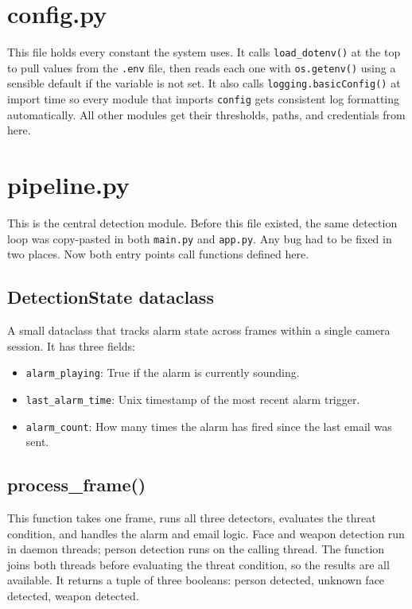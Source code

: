 \documentclass[12pt,a4paper]{report}
\begin{document}
\section{config.py}

This file holds every constant the system uses. It calls \texttt{load\_dotenv()} at the top to pull values from the \texttt{.env} file, then reads each one with \texttt{os.getenv()} using a sensible default if the variable is not set. It also calls \texttt{logging.basicConfig()} at import time so every module that imports \texttt{config} gets consistent log formatting automatically. All other modules get their thresholds, paths, and credentials from here.

\section{pipeline.py}

This is the central detection module. Before this file existed, the same detection loop was copy-pasted in both \texttt{main.py} and \texttt{app.py}. Any bug had to be fixed in two places. Now both entry points call functions defined here.

\subsection{DetectionState dataclass}

A small dataclass that tracks alarm state across frames within a single camera session. It has three fields:

\begin{itemize}
    \item \texttt{alarm\_playing}: True if the alarm is currently sounding.
    \item \texttt{last\_alarm\_time}: Unix timestamp of the most recent alarm trigger.
    \item \texttt{alarm\_count}: How many times the alarm has fired since the last email was sent.
\end{itemize}

\subsection{process\_frame()}

This function takes one frame, runs all three detectors, evaluates the threat condition, and handles the alarm and email logic. Face and weapon detection run in daemon threads; person detection runs on the calling thread. The function joins both threads before evaluating the threat condition, so the results are all available. It returns a tuple of three booleans: person detected, unknown face detected, weapon detected.
\end{document}
